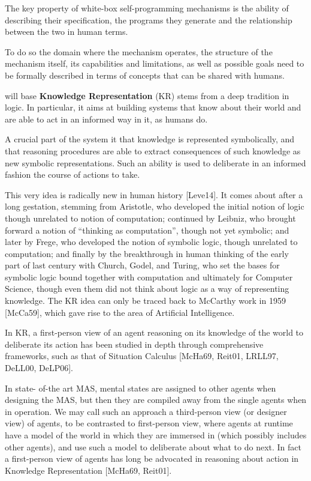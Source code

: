 The key property of white-box self-programming mechanisms is the
ability of describing their specification, the programs they generate
and the relationship between the two in human terms.

To do so the domain where the mechanism operates, the structure of the
mechanism itself, its capabilities and limitations, as well as
possible goals need to be formally described in terms of concepts that
can be shared with humans.

\project will base
\textbf{Knowledge Representation} (KR) stems from a deep
tradition in logic. In particular, it aims at building systems that
know about their world and are able to act in an informed way in it,
as humans do.

A crucial part of the system it that knowledge is represented
symbolically, and that reasoning procedures are able to extract
consequences of such knowledge as new symbolic representations. Such
an ability is used to deliberate in an informed fashion the course of
actions to take.

This very idea is radically new in human history [Leve14]. It comes
about after a long gestation, stemming from Aristotle, who developed
the initial notion of logic though unrelated to notion of computation;
continued by Leibniz, who brought forward a notion of “thinking as
computation”, though not yet symbolic; and later by Frege, who
developed the notion of symbolic logic, though unrelated to
computation; and finally by the breakthrough in human thinking of the
early part of last century with Church, Godel, and Turing, who set the
bases for symbolic logic bound together with computation and
ultimately for Computer Science, though even them did not think about
logic as a way of representing knowledge. The KR idea can only be
traced back to McCarthy work in 1959 [McCa59], which gave rise to the
area of Artificial Intelligence.

In KR, a first-person view of an agent reasoning on its knowledge of
the world to deliberate its action has been studied in depth through
comprehensive frameworks, such as that of Situation Calculus [McHa69,
Reit01, LRLL97, DeLL00, DeLP06]. 

In state- of-the art MAS, mental states are assigned to other agents
when designing the MAS, but then they are compiled away from the
single agents when in operation. We may call such an approach a
third-person view (or designer view) of agents, to be contrasted to
first-person view, where agents at runtime have a model of the world
in which they are immersed in (which possibly includes other agents),
and use such a model to deliberate about what to do next. In fact a
first-person view of agents has long be advocated in reasoning about
action in Knowledge Representation [McHa69, Reit01].


